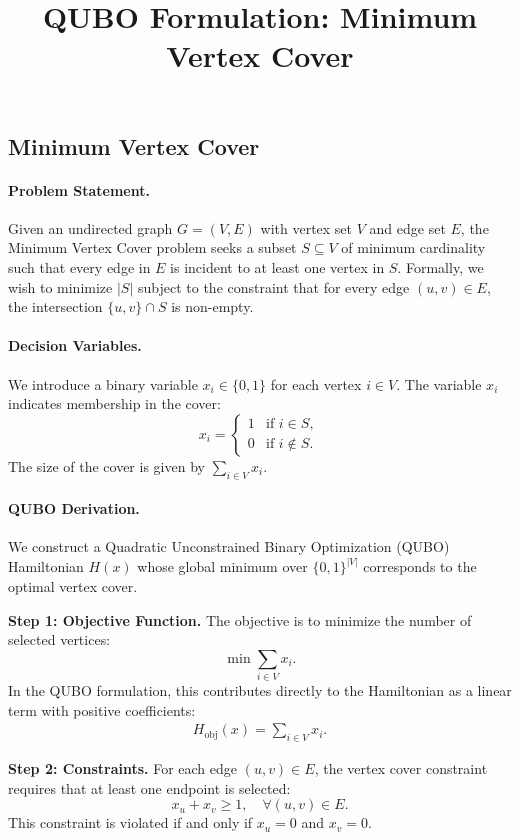 \documentclass[12pt]{article}
\title{QUBO Formulation: Minimum Vertex Cover}
\date{}
\begin{document}
\maketitle

\subsection*{Minimum Vertex Cover}

\paragraph{Problem Statement.}
Given an undirected graph $G = (V, E)$ with vertex set $V$ and edge set $E$, the Minimum Vertex Cover problem seeks a subset $S \subseteq V$ of minimum cardinality such that every edge in $E$ is incident to at least one vertex in $S$. Formally, we wish to minimize $|S|$ subject to the constraint that for every edge $(u, v) \in E$, the intersection $\{u, v\} \cap S$ is non-empty.

\paragraph{Decision Variables.}
We introduce a binary variable $x_i \in \{0, 1\}$ for each vertex $i \in V$. The variable $x_i$ indicates membership in the cover:
\[
x_i = \begin{cases} 
1 & \text{if } i \in S, \\
0 & \text{if } i \notin S.
\end{cases}
\]
The size of the cover is given by $\sum_{i \in V} x_i$.

\paragraph{QUBO Derivation.}
We construct a Quadratic Unconstrained Binary Optimization (QUBO) Hamiltonian $H(x)$ whose global minimum over $\{0,1\}^{|V|}$ corresponds to the optimal vertex cover.

\textbf{Step 1: Objective Function.}
The objective is to minimize the number of selected vertices:
\[
\min \sum_{i \in V} x_i.
\]
In the QUBO formulation, this contributes directly to the Hamiltonian as a linear term with positive coefficients:
\begin{align}
H_{\text{obj}}(x) = \sum_{i \in V} x_i.
\end{align}

\textbf{Step 2: Constraints.}
For each edge $(u, v) \in E$, the vertex cover constraint requires that at least one endpoint is selected:
\[
x_u + x_v \ge 1, \quad \forall (u, v) \in E.
\]
This constraint is violated if and only if $x_u = 0$ and $x_v = 0$.
\end{document}
